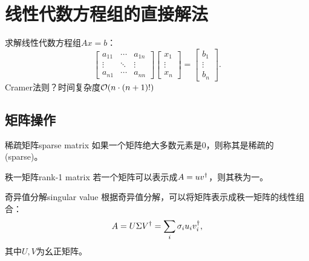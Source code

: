 \chapter{线性代数方程组的直接解法}

求解线性代数方程组$Ax=b$：
\begin{equation}
    \begin{bmatrix}
        a_{11}&\cdots&a_{1n}\\
        \vdots&\ddots&\vdots\\
        a_{n1}&\cdots&a_{nn}
    \end{bmatrix}\begin{bmatrix}
        x_1\\\vdots\\x_n
    \end{bmatrix}=\begin{bmatrix}
        b_1\\\vdots\\b_n
    \end{bmatrix}.
\end{equation}
Cramer法则？时间复杂度$\mathcal O(n\cdot(n+1)!)$

\section{矩阵操作}

\begin{definition}
    {稀疏矩阵}{sparse matrix}
    如果一个矩阵绝大多数元素是0，则称其是稀疏的(sparse)。
\end{definition}

\begin{definition}
    {秩一矩阵}{rank-1 matrix}
    若一个矩阵可以表示成$A=uv^\dagger$，则其秩为一。
\end{definition}

\begin{theorem}
    {奇异值分解}{singular value}
    根据奇异值分解，可以将矩阵表示成秩一矩阵的线性组合：
    \begin{equation}
        A=U\Sigma V^\dagger=\sum_i\sigma_iu_iv_i^\dagger,
    \end{equation}
    其中$U,V$为幺正矩阵。
\end{theorem}

